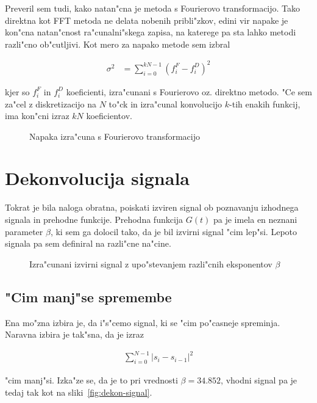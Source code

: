 \documentclass[a4paper,10pt]{article}
\begin{document}
Preveril sem tudi, kako natan"cna je metoda s Fourierovo transformacijo. Tako direktna kot FFT metoda ne delata nobenih pribli"zkov, edini vir napake je kon"cna natan"cnost ra"cunalni"skega zapisa, na katerege pa sta lahko metodi razli"cno ob"cutljivi. Kot mero za napako metode sem izbral

\begin{align}
 \sigma^2 &= \sum_{i=0}^{kN-1} (f_i^F - f_i^D)^2
\end{align}

kjer so $f_i^F$ in $f_i^D$ koeficienti, izra"cunani s Fourierovo oz. direktno metodo. "Ce sem za"cel z diskretizacijo na $N$ to"ck in izra"cunal konvolucijo $k$-tih enakih funkcij, ima kon"cni izraz $kN$ koeficientov. 


\begin{figure}[h]
 \centering

\caption{Napaka izra"cuna s Fourierovo transformacijo}
\end{figure}

\section{Dekonvolucija signala}

Tokrat je bila naloga obratna, poiskati izviren signal ob poznavanju izhodnega signala in prehodne funkcije. Prehodna funkcija $G(t)$ pa je imela en neznani parameter $\beta$, ki sem ga dolocil tako, da je bil izvirni signal "cim lep"si. Lepoto signala pa sem definiral na razli"cne na"cine. 

\begin{figure}[h]
 
 \caption{Izra"cunani izvirni signal z upo"stevanjem razli"cnih eksponentov $\beta$}
\label{fig:decon-3d}
\end{figure}


\subsection{"Cim manj"se spremembe}

Ena mo"zna izbira je, da i"s"cemo signal, ki se "cim po"casneje spreminja. Naravna izbira je tak"sna, da je izraz

\begin{align}
  \sum_{i=0}^{N-1} \left| s_i - s_{i-1}\right|^2
\end{align}

"cim manj"si. Izka"ze se, da je to pri vrednosti $\beta = 34.852$, vhodni signal pa je tedaj tak kot na sliki~\ref{fig:dekon-signal}. 
\end{document}
